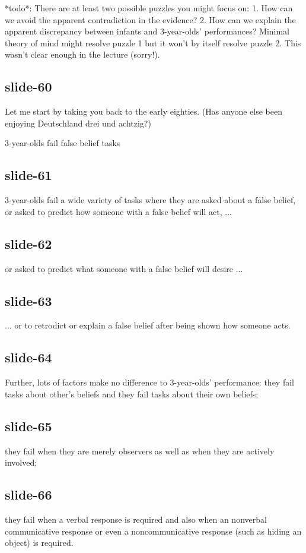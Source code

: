 \documentclass[12pt,\papersize]{extarticle}
\begin{document}
*todo*: There are at least two possible puzzles you might focus on:
1. How can we avoid the apparent contradiction in the evidence?
2. How can we explain the apparent discrepancy between infants and 3-year-olds' performances?
Minimal theory of mind might resolve puzzle 1 but it won't by itself resolve puzzle 2.
This wasn't clear enough in the lecture (sorry!).

\subsection{slide-60}
Let me start by taking you back to the early eighties.
(Has anyone else been enjoying Deutschland drei und achtzig?)

3-year-olds fail false belief tasks

\subsection{slide-61}
3-year-olds fail a wide variety of tasks where they are asked about a
false belief, or  asked to predict how someone with a false belief will
act, ...

\subsection{slide-62}
or asked to predict what someone with a false belief will desire ...

\subsection{slide-63}
... or to retrodict or explain a false belief after being shown how someone acts.

\subsection{slide-64}
Further,
lots of factors make no difference to 3-year-olds’ performance: they fail
tasks about other’s beliefs and they fail tasks about their own beliefs;

\subsection{slide-65}
they fail when they are merely observers as well as when they are actively
involved;

\subsection{slide-66}
they fail when a verbal response is required and also when an
nonverbal communicative response or even a noncommunicative response (such
as hiding an object) is required.
\end{document}
